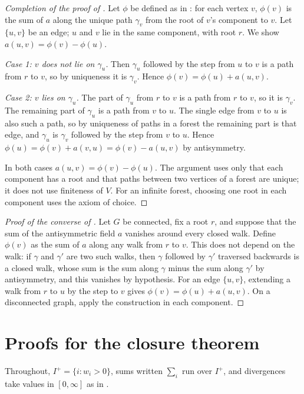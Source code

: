 \documentclass[11pt]{article}
\theoremstyle{definition}
\newcommand{\1}{\mathbf{1}}
\begin{document}
\begin{proof}[Completion of the proof of ]
Let $\phi$ be defined as in : for each vertex $v$, $\phi(v)$ is the sum of $a$ along the unique path $\gamma_v$ from the root of $v$'s component to $v$.
Let $\{u,v\}$ be an edge; $u$ and $v$ lie in the same component, with root $r$.
We show $a(u,v)=\phi(v)-\phi(u)$.

\emph{Case 1: $v$ does not lie on $\gamma_u$.}
Then $\gamma_u$ followed by the step from $u$ to $v$ is a path from $r$ to $v$, so by uniqueness it is $\gamma_v$.
Hence $\phi(v)=\phi(u)+a(u,v)$.

\emph{Case 2: $v$ lies on $\gamma_u$.}
The part of $\gamma_u$ from $r$ to $v$ is a path from $r$ to $v$, so it is $\gamma_v$.
The remaining part of $\gamma_u$ is a path from $v$ to $u$.
The single edge from $v$ to $u$ is also such a path, so by uniqueness of paths in a forest the remaining part is that edge, and $\gamma_u$ is $\gamma_v$ followed by the step from $v$ to $u$.
Hence $\phi(u)=\phi(v)+a(v,u)=\phi(v)-a(u,v)$ by antisymmetry.

In both cases $a(u,v)=\phi(v)-\phi(u)$.
The argument uses only that each component has a root and that paths between two vertices of a forest are unique; it does not use finiteness of $V$.
For an infinite forest, choosing one root in each component uses the axiom of choice.
\end{proof}

\begin{proof}[Proof of the converse of ]
Let $G$ be connected, fix a root $r$, and suppose that the sum of the antisymmetric field $a$ vanishes around every closed walk.
Define $\phi(v)$ as the sum of $a$ along any walk from $r$ to $v$.
This does not depend on the walk: if $\gamma$ and $\gamma'$ are two such walks, then $\gamma$ followed by $\gamma'$ traversed backwards is a closed walk, whose sum is the sum along $\gamma$ minus the sum along $\gamma'$ by antisymmetry, and this vanishes by hypothesis.
For an edge $\{u,v\}$, extending a walk from $r$ to $u$ by the step to $v$ gives $\phi(v)=\phi(u)+a(u,v)$.
On a disconnected graph, apply the construction in each component.
\end{proof}
 \section{Proofs for the closure theorem}\label{app:varclosure}

Throughout, $I^+=\{i:w_i>0\}$, sums written $\sum_i$ run over $I^+$, and divergences take values in $[0,\infty]$ as in .
\end{document}
